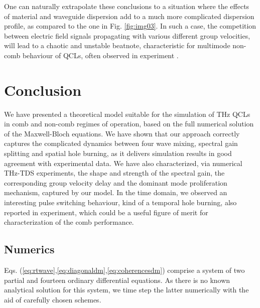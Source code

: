\documentclass[10pt,letterpaper]{article}
\begin{document}
{One can naturally extrapolate these conclusions to a situation where the effects of material and waveguide dispersion add to a much more complicated dispersion profile, as compared to the one in Fig. \ref{fig:img03}. In such a case, the competition between electric field signals propagating with various different group velocities, will lead to a chaotic and unstable beatnote, characteristic for multimode non-comb behaviour of QCLs, often observed in experiment \cite{wienold2014evidence,burghoff2014terahertz,rosch2015octave}.  

\section{Conclusion}
We have presented a theoretical model suitable for the simulation of THz QCLs in comb and non-comb regimes of operation, based on the full numerical solution of the Maxwell-Bloch equations. We have shown that our approach correctly captures the complicated dynamics between four wave mixing, spectral gain splitting and spatial hole burning, as it delivers simulation results in good agreement with experimental data. We have also characterized, via numerical THz-TDS experiments, the shape and strength of the spectral gain, the corresponding group velocity delay and the dominant mode proliferation mechanism, captured by our model. In the time domain, we observed an interesting pulse switching behaviour, kind of a temporal hole burning, also reported in experiment, which could be a useful figure of merit for characterization of the comb performance.     
\newpage

\begin{appendices}
\section{Numerics}
\label{sec:numerics}

Eqs. (\ref{eq:rtwave},\ref{eq:diagonaldm},\ref{eq:coherencesdm}) comprise a system of two partial and fourteen ordinary differential equations. As there is no known analytical solution for this system, we time step the latter numerically with the aid of carefully chosen schemes. 


\end{appendices}}
\end{document}
